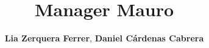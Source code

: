 \documentclass[sn-mathphys,Numbered]{sn-jnl}%
\theoremstyle{thmstyleone}%
\theoremstyle{thmstyletwo}%
\theoremstyle{thmstylethree}%
\begin{document}
\title[Manager Mauro]{Manager Mauro}


\author{\textbf{Lia Zerquera Ferrer},
\textbf{Daniel C\'ardenas Cabrera}}





% 
% 
% 
\end{document}

